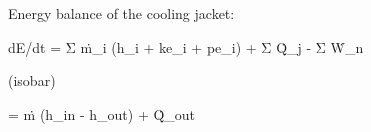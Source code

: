 Energy balance of the cooling jacket:  

dE/dt = Σ ṁ_i (h_i + ke_i + pe_i) + Σ Q̇_j - Σ Ẇ_n  

(isobar)  

= ṁ (h_in - h_out) + Q̇_out